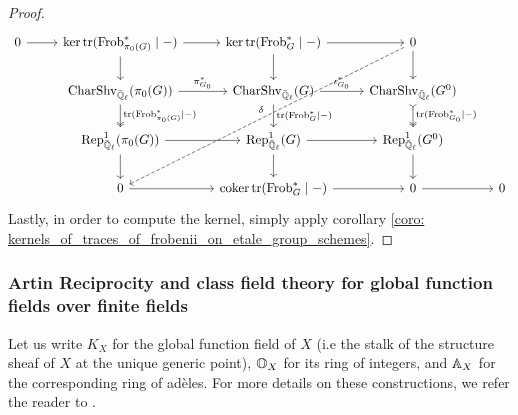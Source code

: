 \begin{proof}
                            $$
                                \begin{tikzcd}
                                	0 & {\ker \trace(\Frob^*_{\pi_0(G)} \mid -)} & {\ker \trace(\Frob^*_G \mid -)} & 0 \\
                                	& {\Char\Shv_{\bar{\Q}_{\ell}}(\pi_0(G))} & {\Char\Shv_{\bar{\Q}_{\ell}}(G)} & {\Char\Shv_{\bar{\Q}_{\ell}}(G^0)} \\
                                	& {\Rep^1_{\bar{\Q}_{\ell}}(\pi_0(G))} & {\Rep^1_{\bar{\Q}_{\ell}}(G)} & {\Rep^1_{\bar{\Q}_{\ell}}(G^0)} \\
                                	& 0 & {\coker \trace(\Frob^*_G \mid -)} & 0 & 0
                                	\arrow["{\trace(\Frob^*_{\pi_0(G)} \mid -)}", two heads, from=2-2, to=3-2]
                                	\arrow["{\trace(\Frob^*_G \mid -)}", from=2-3, to=3-3]
                                	\arrow["{\trace(\Frob^*_{G_0} \mid -)}", tail, two heads, from=2-4, to=3-4]
                                	\arrow["{\pi_{G_0}^*}", from=2-2, to=2-3]
                                	\arrow["{\iota_{G_0}^*}", from=2-3, to=2-4]
                                	\arrow[from=3-2, to=3-3]
                                	\arrow[from=3-3, to=3-4]
                                	\arrow[from=1-1, to=1-2]
                                	\arrow[from=1-2, to=1-3]
                                	\arrow[from=1-3, to=1-4]
                                	\arrow["\delta"', dashed, from=1-4, to=4-2]
                                	\arrow[from=4-2, to=4-3]
                                	\arrow[from=4-3, to=4-4]
                                	\arrow[from=4-4, to=4-5]
                                	\arrow[from=1-4, to=2-4]
                                	\arrow[from=3-4, to=4-4]
                                	\arrow[from=3-2, to=4-2]
                                	\arrow[from=1-2, to=2-2]
                                	\arrow[from=1-3, to=2-3]
                                	\arrow[from=3-3, to=4-3]
                                \end{tikzcd}
                            $$
                        Lastly, in order to compute the kernel, simply apply corollary \ref{coro: kernels_of_traces_of_frobenii_on_etale_group_schemes}.
                    \end{proof}
            
            \subsubsection{Artin Reciprocity and class field theory for global function fields over finite fields}
                \begin{convention} \label{conv: global_function_field}
                    Let us write $K_X$ for the global function field of $X$ (i.e the stalk of the structure sheaf of $X$ at the unique generic point), $\mathbb{O}_X$ for its ring of integers, and $\mathbb{A}_X$ for the corresponding ring of ad\`eles. For more details on these constructions, we refer the reader to \cite[Section VI.1]{neukirch_2010_algebraic_number_theory}. 
                \end{convention}
                
